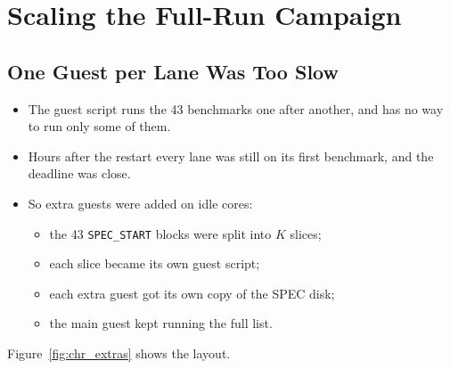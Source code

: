 \section{Scaling the Full-Run Campaign}
\label{sec:chr_scale}

\subsection{One Guest per Lane Was Too Slow}
\begin{itemize}
    \item The guest script runs the 43 benchmarks one after another, and has no way to run only some of them.
    \item Hours after the restart every lane was still on its first benchmark, and the deadline was close.
    \item So extra guests were added on idle cores:
    \begin{itemize}
        \item the 43 \texttt{SPEC\_START} blocks were split into $K$ slices;
        \item each slice became its own guest script;
        \item each extra guest got its own copy of the SPEC disk;
        \item the main guest kept running the full list.
    \end{itemize}
\end{itemize}
Figure~\ref{fig:chr_extras} shows the layout.

